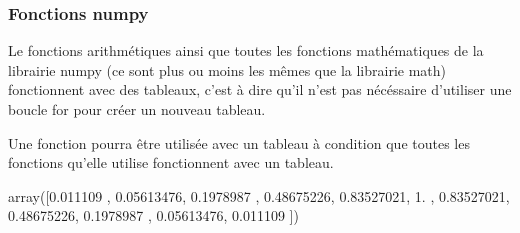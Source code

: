\documentclass[letterpaper,10pt,english]{sphinxhowto}
\begin{document}
\begin{sphinxVerbatim}[commandchars=\\\{\}]
    
\end{sphinxVerbatim}

\begin{sphinxVerbatim}[commandchars=\\\{\}]
[  1.           1.58489319   2.51188643   3.98107171   6.30957344
  10.          15.84893192  25.11886432  39.81071706  63.09573445
 100.        ]
\end{sphinxVerbatim}


\subsubsection{Fonctions numpy}
\label{\detokenize{cours5_numpy_cours:fonctions-numpy}}
\sphinxAtStartPar
Le fonctions arithmétiques ainsi que toutes les fonctions mathématiques de la librairie numpy (ce sont plus ou moins les mêmes que la librairie math) fonctionnent avec des tableaux, c’est à dire qu’il n’est pas nécéssaire d’utiliser une boucle for pour créer un nouveau tableau.

\sphinxAtStartPar
Une fonction pourra être utilisée avec un tableau à condition que toutes les fonctions qu’elle utilise fonctionnent avec un tableau.

\begin{sphinxVerbatim}[commandchars=\\\{\}]
   
        

  
\end{sphinxVerbatim}

\begin{sphinxVerbatim}[commandchars=\\\{\}]
array([0.011109  , 0.05613476, 0.1978987 , 0.48675226, 0.83527021,
       1.        , 0.83527021, 0.48675226, 0.1978987 , 0.05613476,
       0.011109  ])
\end{sphinxVerbatim}
\end{document}
